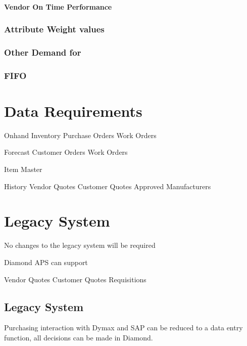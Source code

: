 \documentclass[letterpaper,10pt,english]{sphinxmanual}
\begin{document}
\subsubsection{Vendor On Time Performance}
\label{\detokenize{BusinessProcessReengineering:vendor-on-time-performance}}

\subsection{Attribute Weight values}
\label{\detokenize{BusinessProcessReengineering:attribute-weight-values}}

\subsection{Other Demand for}
\label{\detokenize{BusinessProcessReengineering:other-demand-for}}

\subsection{FIFO}
\label{\detokenize{BusinessProcessReengineering:fifo}}

\chapter{Data Requirements}
\label{\detokenize{BusinessProcessReengineering:data-requirements}}
Onhand Inventory Purchase Orders Work Orders

Forecast Customer Orders Work Orders

Item Master

History Vendor Quotes Customer Quotes Approved Manufacturers


\chapter{Legacy System}
\label{\detokenize{BusinessProcessReengineering:legacy-system}}
No changes to the legacy system will be required

Diamond APS can support

Vendor Quotes Customer Quotes Requisitions


\section{Legacy System}
\label{\detokenize{BusinessProcessReengineering:id2}}
Purchasing interaction with Dymax and SAP can be reduced to a data entry
function, all decisions can be made in Diamond.
\end{document}
